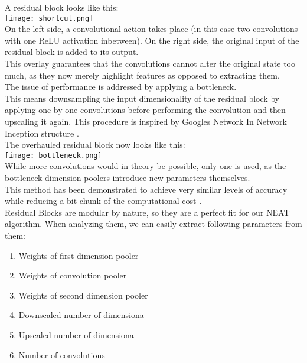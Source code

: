 A residual block looks like this: \\
\texttt{[image: shortcut.png]}\\
On the left side, a convolutional action takes place (in this case two convolutions with one ReLU activation inbetween). On the right side, the original input of the residual block is added to its output.\\
This overlay guarantees that the convolutions cannot alter the original state too much, as they now merely highlight features as opposed to extracting them.\\
The issue of performance is addressed by applying a bottleneck.\\
This means downsampling the input dimensionality of the residual block by applying one by one convolutions before performing the convolution and then upscaling it again. This procedure is inspired by Googles Network In Network Inception structure \cite{KaimingHe2015} \cite{Lin2014}.\\
The overhauled residual block now looks like this:\\
\texttt{[image: bottleneck.png]}\\
While more convolutions would in theory be possible, only one is used, as the bottleneck dimension poolers introduce new parameters themselves.\\
This method has been demonstrated to achieve very similar levels of accuracy while reducing a bit chunk of the computational cost \cite{KaimingHe2015}.\\
Residual Blocks are modular by nature, so they are a perfect fit for our NEAT algorithm. When analyzing them, we can easily extract following parameters from them:\\
\begin{enumerate}
	\item{Weights of first dimension pooler}
	\item{Weights of convolution pooler}
	\item{Weights of second dimension pooler}
	\item{Downscaled number of dimensiona}
	\item{Upscaled number of dimensiona}
	\item{Number of convolutions}
\end{enumerate}